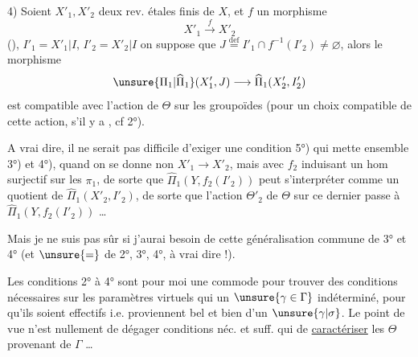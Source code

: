 4) Soient $X'_1,X'_2$ deux rev. étales finis de $X$, et $f$ un morphisme
\[
X'_1\xrightarrow{f}X'_2
\]
(), $I'_1=X'_1\vert I$, $I'_2=X'_2\vert I$ on suppose  que $J\overset{\mathrm{def}}=I'_1\cap f^{-1}(I'_2)\ne\varnothing$,   alors  le morphisme
\[
\unsure{\Pi_1|\widehat{\Pi}_1}(X'_1,J)\longrightarrow\widehat{\Pi}_1(X'_2,I'_2)
\]
est compatible avec l'action  de $\Theta$ sur les groupoïdes (pour un choix compatible de cette action, s'il y a , cf 2°).

A vrai dire, il ne serait pas difficile d'exiger une condition 5°) qui mette ensemble 3°) et 4°), quand on se donne non $X'_1\to X'_2$, mais
avec $f_2$  induisant un hom  surjectif sur les $\pi_1$, de sorte que $\widehat{\Pi}_1(Y,f_2(I'_2))$ peut s'interpréter comme un quotient de $\widehat{\Pi}_1(X'_2,I'_2)$, de sorte que l'action  $\Theta'_2$ de $\Theta$ sur ce dernier passe à $\widehat{\Pi}_1(Y,f_2(I'_2))$ \ldots

Mais je ne suis pas sûr si j'aurai besoin de cette généralisation commune de 3° et 4° (et $\unsure{=}$ de 2°, 3°, 4°, à vrai dire !).

Les conditions 2° à 4° sont pour moi  une \uline{} commode pour trouver des conditions nécessaires sur les paramètres virtuels qui  un $\unsure{\gamma\in\Gamma}$ indéterminé, pour qu'ils soient effectifs i.e. proviennent bel et bien d'un $\unsure{\gamma|\sigma}$. Le point de vue n'est nullement de dégager  conditions néc. et suff. qui  de \uline{caractériser} les $\Theta$ provenant de $\Gamma$ \ldots
{}

\hrulefill


